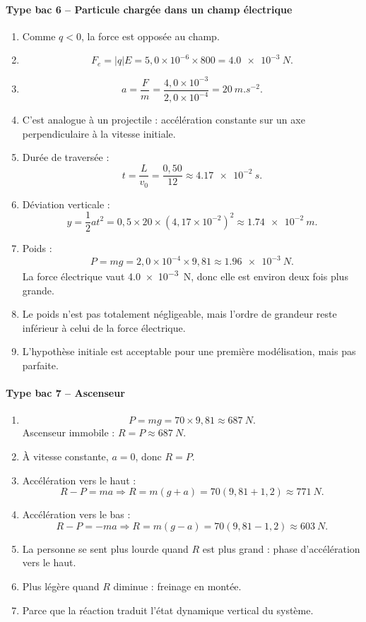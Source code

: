 \documentclass[11pt,a4paper]{article}
\theoremstyle{definition}
\begin{document}
\paragraph{Type bac 6 -- Particule chargée dans un champ électrique}
\begin{enumerate}[label=\arabic*.]
    \item Comme $q<0$, la force est opposée au champ.
    \item
    \[
    F_e=|q|E=5,0\times10^{-6}\times 800=\SI{4,0e-3}{N}.
    \]
    \item
    \[
    a=\frac{F}{m}=\frac{4,0\times10^{-3}}{2,0\times10^{-4}}=\SI{20}{m.s^{-2}}.
    \]
    \item C’est analogue à un projectile : accélération constante sur un axe perpendiculaire à la vitesse initiale.
    \item Durée de traversée :
    \[
    t=\frac{L}{v_0}=\frac{0,50}{12}\approx \SI{4,17e-2}{s}.
    \]
    \item Déviation verticale :
    \[
    y=\frac12 at^2=0,5\times20\times(4,17\times10^{-2})^2\approx \SI{1,74e-2}{m}.
    \]
    \item Poids :
    \[
    P=mg=2,0\times10^{-4}\times9,81\approx \SI{1,96e-3}{N}.
    \]
    La force électrique vaut \SI{4,0e-3}{N}, donc elle est environ deux fois plus grande.
    \item Le poids n’est pas totalement négligeable, mais l’ordre de grandeur reste inférieur à celui de la force électrique.
    \item L’hypothèse initiale est acceptable pour une première modélisation, mais pas parfaite.
\end{enumerate}

\paragraph{Type bac 7 -- Ascenseur}
\begin{enumerate}[label=\arabic*.]
    \item
    \[
    P=mg=70\times9,81\approx \SI{687}{N}.
    \]
    Ascenseur immobile : $R=P\approx \SI{687}{N}$.
    \item À vitesse constante, $a=0$, donc $R=P$.
    \item Accélération vers le haut :
    \[
    R-P=ma \Rightarrow R=m(g+a)=70(9,81+1,2)\approx \SI{771}{N}.
    \]
    \item Accélération vers le bas :
    \[
    R-P=-ma \Rightarrow R=m(g-a)=70(9,81-1,2)\approx \SI{603}{N}.
    \]
    \item La personne se sent plus lourde quand $R$ est plus grand : phase d’accélération vers le haut.
    \item Plus légère quand $R$ diminue : freinage en montée.
    \item Parce que la réaction traduit l’état dynamique vertical du système.
\end{enumerate}
\end{document}
